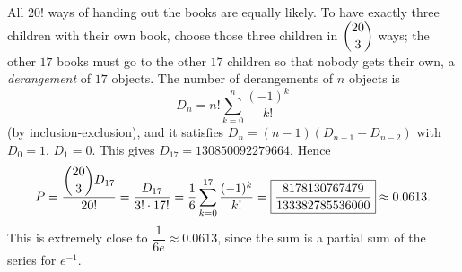 All $20!$ ways of handing out the books are equally likely. To have exactly three children with their own book, choose those three children in $\dbinom{20}{3}$ ways; the other $17$ books must go to the other $17$ children so that nobody gets their own, a \emph{derangement} of $17$ objects. The number of derangements of $n$ objects is
\[
D_n=n!\sum_{k=0}^{n}\dfrac{(-1)^k}{k!}
\]
(by inclusion-exclusion), and it satisfies $D_n=(n-1)(D_{n-1}+D_{n-2})$ with $D_0=1$, $D_1=0$. This gives $D_{17}=130850092279664$. Hence
\[
P=\dfrac{\dbinom{20}{3}D_{17}}{20!}=\dfrac{D_{17}}{3!\cdot17!}=\dfrac{1}{6}\sum_{k=0}^{17}\dfrac{(-1)^k}{k!}=\boxed{\dfrac{8178130767479}{133382785536000}}\approx0.0613 .
\]
This is extremely close to $\dfrac{1}{6e}\approx0.0613$, since the sum is a partial sum of the series for $e^{-1}$.
